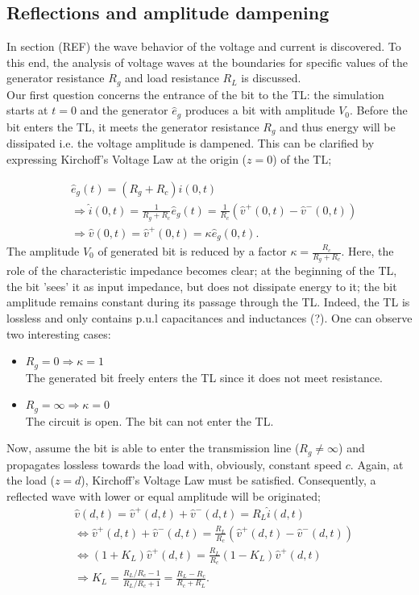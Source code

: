\subsection{Reflections and amplitude dampening}
In section (REF) the wave behavior of the voltage and current is discovered. To this end, the analysis of voltage waves at the boundaries for specific values of the generator resistance $R_g$ and load resistance $R_L$ is discussed. \\

Our first question concerns the entrance of the bit to the TL: the simulation starts at $t=0$ and the generator $\hat{e}_g$ produces a bit with amplitude $V_0$. Before the bit enters the TL, it meets the generator resistance $R_g$ and thus energy will be dissipated i.e. the voltage amplitude is dampened. This can be clarified by expressing Kirchoff's Voltage Law at the origin ($z=0$) of the TL;

\begin{align}
&\hat{e}_g(t) = (R_g + R_c)\hat{i}(0, t) \\
&\Rightarrow \hat{i}(0, t) = \frac{1}{R_g+R_c}\hat{e}_g(t)= \frac{1}{R_c}(\hat{v}^{+}(0, t) - \hat{v}^{-}(0, t)) \\
&\Rightarrow \hat{v}(0, t) = \hat{v}^{+}(0, t) =\kappa\hat{e}_g(0, t)\label{enter}.
\end{align}
The amplitude $V_0$ of generated bit is reduced by a factor $\kappa = \frac{R_c}{R_g + R_c}$. Here, the role of the characteristic impedance becomes clear; at the beginning of the TL, the bit 'sees' it as input impedance, but does not dissipate energy to it; the bit amplitude remains constant during its passage through the TL. Indeed, the TL is lossless and only contains p.u.l capacitances and inductances (?). One can observe two interesting cases:
\begin{itemize}
\item $R_g = 0 \Rightarrow \kappa = 1$\\ The generated bit freely enters the TL since it does not meet resistance.
\item $R_g = \infty \Rightarrow \kappa = 0$ \\ The circuit is open. The bit can not enter the TL.
\end{itemize}

Now, assume the bit is able to enter the transmission line ($R_g \neq \infty$) and propagates lossless towards the load with, obviously, constant speed $c$. Again, at the load ($z=d$), Kirchoff's Voltage Law must be satisfied. Consequently, a reflected wave with lower or equal amplitude will be originated;
\begin{align}
&\hat{v}(d, t) = \hat{v}^{+}(d, t) + \hat{v}^{-}(d, t) = R_L\hat{i}(d, t) \\
&\Leftrightarrow \hat{v}^{+}(d, t) + \hat{v}^{-}(d, t) = \frac{R_L}{R_c}(\hat{v}^{+}(d, t) - \hat{v}^{-}(d, t)) \\
&\Leftrightarrow (1 + K_L)\hat{v}^{+}(d, t) = \frac{R_L}{R_c}(1 - K_L)\hat{v}^{+}(d, t) \\
&\Rightarrow K_L = \frac{R_L/R_c - 1}{R_L/R_c + 1} = \frac{R_L - R_c}{R_c + R_L}.
\end{align}

